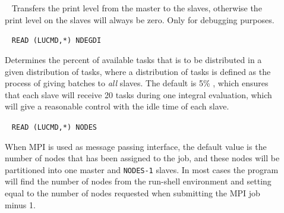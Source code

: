\begin{description}

\item[]\verb| |
Transfers the print level from the master
to the slaves, otherwise the print level on the slaves will always be
zero. Only for debugging purposes.

\item[]\verb| |\newline
\verb|READ (LUCMD,*) NDEGDI|

Determines the percent of available tasks that
is to be distributed in
a given distribution of tasks, where a distribution of tasks is defined
as the process of giving batches to {\em all} slaves. The default is
5\% , which ensures that each slave will receive 20 tasks during one
integral evaluation, which will give a reasonable control with the
idle time of each slave.

%
%
%

\item[]\verb| |\newline
\verb|READ (LUCMD,*) NODES|

When MPI is used as message passing interface, the
default value is the number of nodes that has been assigned to the
job, and these nodes will be partitioned into one master and
\verb|NODES-1| slaves. In most cases the program will
find the number of nodes from the run-shell environment and setting
equal to the number of nodes requested when submitting the MPI job minus 1.


\end{description}
